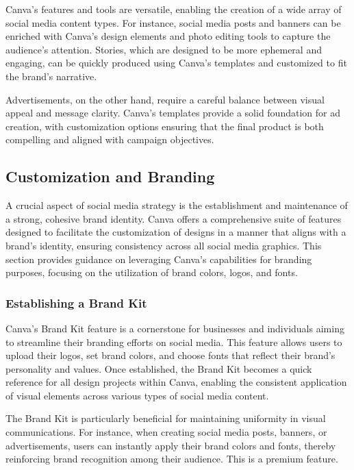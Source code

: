 \documentclass[
]{book}
\begin{document}
Canva's features and tools are versatile, enabling the creation of a wide array of social media content types. For instance, social media posts and banners can be enriched with Canva's design elements and photo editing tools to capture the audience's attention. Stories, which are designed to be more ephemeral and engaging, can be quickly produced using Canva's templates and customized to fit the brand's narrative.

Advertisements, on the other hand, require a careful balance between visual appeal and message clarity. Canva's templates provide a solid foundation for ad creation, with customization options ensuring that the final product is both compelling and aligned with campaign objectives.

\hypertarget{customization-and-branding}{%
\subsection*{Customization and Branding}\label{customization-and-branding}}

A crucial aspect of social media strategy is the establishment and maintenance of a strong, cohesive brand identity. Canva offers a comprehensive suite of features designed to facilitate the customization of designs in a manner that aligns with a brand's identity, ensuring consistency across all social media graphics. This section provides guidance on leveraging Canva's capabilities for branding purposes, focusing on the utilization of brand colors, logos, and fonts.

\hypertarget{establishing-a-brand-kit}{%
\subsubsection*{Establishing a Brand Kit}\label{establishing-a-brand-kit}}

Canva's Brand Kit feature is a cornerstone for businesses and individuals aiming to streamline their branding efforts on social media. This feature allows users to upload their logos, set brand colors, and choose fonts that reflect their brand's personality and values. Once established, the Brand Kit becomes a quick reference for all design projects within Canva, enabling the consistent application of visual elements across various types of social media content.

The Brand Kit is particularly beneficial for maintaining uniformity in visual communications. For instance, when creating social media posts, banners, or advertisements, users can instantly apply their brand colors and fonts, thereby reinforcing brand recognition among their audience. This is a premium feature.
\end{document}
